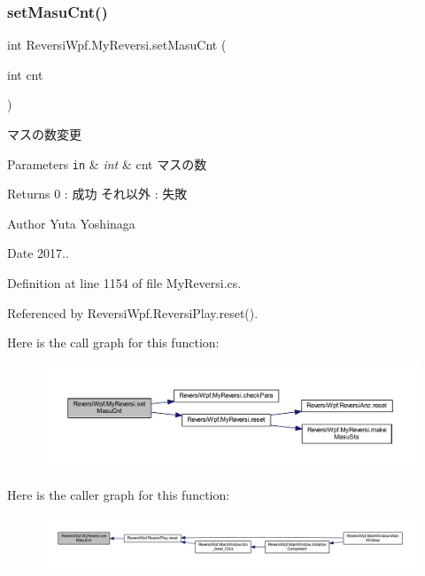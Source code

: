 \subsubsection{\texorpdfstring{set\+Masu\+Cnt()}{setMasuCnt()}}
{\footnotesize\ttfamily int Reversi\+Wpf.\+My\+Reversi.\+set\+Masu\+Cnt (\begin{DoxyParamCaption}\item[{int}]{cnt }\end{DoxyParamCaption})}



マスの数変更 


\begin{DoxyParams}[1]{Parameters}
\mbox{\tt in}  & {\em int} & cnt マスの数 \\
\hline
\end{DoxyParams}
\begin{DoxyReturn}{Returns}
0 \+: 成功 それ以外 \+: 失敗 
\end{DoxyReturn}
\begin{DoxyAuthor}{Author}
Yuta Yoshinaga 
\end{DoxyAuthor}
\begin{DoxyDate}{Date}
2017.. 
\end{DoxyDate}


Definition at line 1154 of file My\+Reversi.\+cs.



Referenced by Reversi\+Wpf.\+Reversi\+Play.\+reset().

Here is the call graph for this function\+:\nopagebreak
\begin{figure}[H]
\begin{center}
\leavevmode
\includegraphics[width=350pt]{class_reversi_wpf_1_1_my_reversi_a1e25c6ee30dd15b6ae87e355bddd6af6_cgraph}
\end{center}
\end{figure}
Here is the caller graph for this function\+:\nopagebreak
\begin{figure}[H]
\begin{center}
\leavevmode
\includegraphics[width=350pt]{class_reversi_wpf_1_1_my_reversi_a1e25c6ee30dd15b6ae87e355bddd6af6_icgraph}
\end{center}
\end{figure}
\mbox{\label{class_reversi_wpf_1_1_my_reversi_a03c7e639718936243e30302680c63f99}} 
